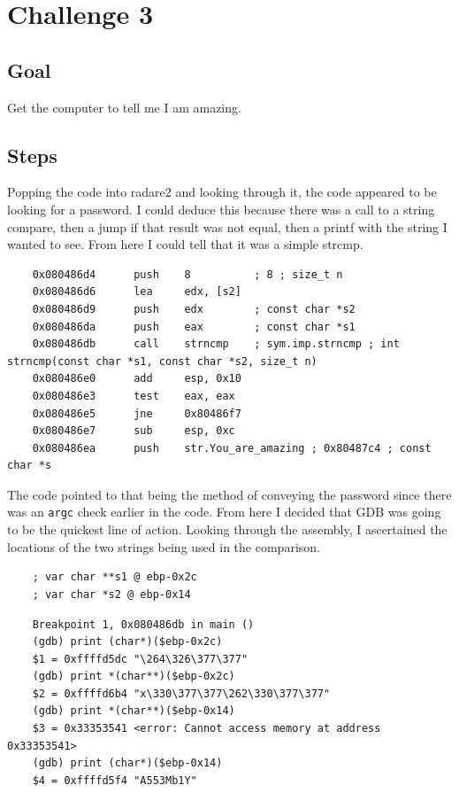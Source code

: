 \documentclass[11pt]{article}
\begin{document}
\section*{Challenge 3}
\subsection*{Goal}
Get the computer to tell me I am amazing.

\subsection*{Steps}

Popping the code into radare2 and looking through it, the code appeared to be looking for a password. I could deduce this because there was a call to a string compare, then a jump if that result was not equal, then a printf with the string I wanted to see. From here I could tell that it was a simple strcmp.
\begin{lstlisting}
    0x080486d4      push    8          ; 8 ; size_t n
    0x080486d6      lea     edx, [s2]
    0x080486d9      push    edx        ; const char *s2
    0x080486da      push    eax        ; const char *s1
    0x080486db      call    strncmp    ; sym.imp.strncmp ; int strncmp(const char *s1, const char *s2, size_t n)
    0x080486e0      add     esp, 0x10
    0x080486e3      test    eax, eax
    0x080486e5      jne     0x80486f7
    0x080486e7      sub     esp, 0xc
    0x080486ea      push    str.You_are_amazing ; 0x80487c4 ; const char *s
\end{lstlisting}

The code pointed to that being the method of conveying the password since there was an \texttt{argc} check earlier in the code. From here I decided that GDB was going to be the quickest line of action. Looking through the assembly, I ascertained the locations of the two strings being used in the comparison.

\begin{lstlisting}
    ; var char **s1 @ ebp-0x2c
    ; var char *s2 @ ebp-0x14 
\end{lstlisting}

\begin{lstlisting}
    Breakpoint 1, 0x080486db in main ()
    (gdb) print (char*)($ebp-0x2c)
    $1 = 0xffffd5dc "\264\326\377\377"
    (gdb) print *(char**)($ebp-0x2c)
    $2 = 0xffffd6b4 "x\330\377\377\262\330\377\377"
    (gdb) print *(char**)($ebp-0x14)
    $3 = 0x33353541 <error: Cannot access memory at address 0x33353541>
    (gdb) print (char*)($ebp-0x14)
    $4 = 0xffffd5f4 "A553Mb1Y"
\end{lstlisting}
\end{document}
